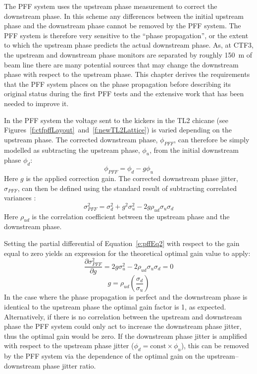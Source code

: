 
The PFF system uses the upstream phase measurement to correct the downstream phase. In this scheme any differences between the initial upstream phase and the downstream phase cannot be removed by the PFF system. The PFF system is therefore very sensitive to the ``phase propagation'', or the extent to which the upstream phase predicts the actual downstream phase. As, at CTF3, the upstream and downstream phase monitors are separated by roughly 150~m of beam line there are many potential sources that may change the downstream phase with respect to the upstream phase. This chapter derives the requirements that the PFF system places on the phase propagation before describing its original status during the first PFF tests and the extensive work that has been needed to improve it.


In the PFF system the voltage sent to the kickers in the TL2 chicane (see Figures~\ref{f:ctfpffLayout}~and~\ref{f:newTL2Lattice}) is varied depending on the upstream phase. The corrected downstream phase, \(\phi_{PFF}\), can therefore be simply modelled as subtracting the upstream phase, \(\phi_u\), from the initial downstream phase \(\phi_d\):
\begin{equation}
\phi_{PFF} = \phi_d - g\phi_u
\label{e:pffEq1}
\end{equation}
Here \(g\) is the applied correction gain. The corrected downstream phase jitter, \(\sigma_{PFF}\), can then be defined using the standard result of subtracting correlated variances \cite{sumVar}:
\begin{equation}
\sigma_{PFF}^2 = \sigma_d^2 + g^2\sigma_u^2 - 2g\rho_{ud}\sigma_u\sigma_d
\label{e:pffEq2}
\end{equation}
Here \(\rho_{ud}\) is the correlation coefficient between the upstream phase and the downstream phase. 

Setting the partial differential of Equation~\ref{e:pffEq2} with respect to the gain equal to zero yields an expression for the theoretical optimal gain value to apply:
\begin{equation}
\frac{\partial \sigma_{PFF}^2}{\partial g} = 2g\sigma_u^2 - 2\rho_{ud}\sigma_u\sigma_d = 0
\end{equation}
\begin{equation}
g = \rho_{ud}\left(\frac{\sigma_d}{\sigma_u}\right)
\label{e:theoretOptGain}
\end{equation}
In the case where the phase propagation is perfect and the downstream phase is identical to the upstream phase the optimal gain factor is 1, as expected. Alternatively, if there is no correlation between the upstream and downstream phase the PFF system could only act to increase the downstream phase jitter, thus the optimal gain would be zero. If the downstream phase jitter is amplified with respect to the upstream phase jitter (\(\phi_d = \mathrm{const}\times\phi_u\)), this can be removed by the PFF system via the dependence of the optimal gain on the upstream--downstream phase jitter ratio.

